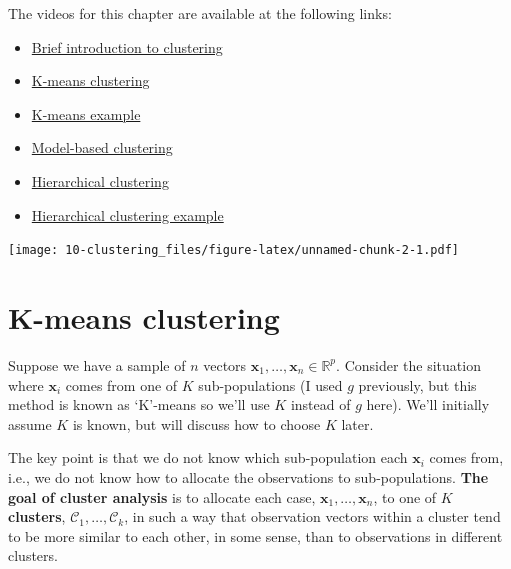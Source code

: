 \documentclass[
]{book}
\providecommand{\tightlist}{%
  \setlength{\itemsep}{0pt}\setlength{\parskip}{0pt}}
\theoremstyle{definition}
\theoremstyle{definition}
\theoremstyle{definition}
\theoremstyle{definition}
\theoremstyle{remark}
\begin{document}
The videos for this chapter are available at the following links:

\begin{itemize}
\tightlist
\item
  \href{https://mediaspace.nottingham.ac.uk/media/ClusteringA+Introduction/1_771r59k0}{Brief introduction to clustering}
\item
  \href{https://mediaspace.nottingham.ac.uk/media/ClusteringA+K-means+clustering/1_vqjrjyey}{K-means clustering}
\item
  \href{https://mediaspace.nottingham.ac.uk/media/ClusteringA+K-means+example/1_6fhpxnii}{K-means example}
\item
  \href{https://mediaspace.nottingham.ac.uk/media/ClusteringA+Model-based+clustering/1_89rjovbp}{Model-based clustering}
\item
  \href{https://mediaspace.nottingham.ac.uk/media/ClusteringA+Hierarchical+methods/1_ngog5anc}{Hierarchical clustering}
\item
  \href{https://mediaspace.nottingham.ac.uk/media/ClusteringA+Hierarchical+example/1_kuzx1iy6}{Hierarchical clustering example}
\end{itemize}

\texttt{[image: 10-clustering\_files/figure-latex/unnamed-chunk-2-1.pdf]}

\hypertarget{k-means-clustering}{%
\section{K-means clustering}\label{k-means-clustering}}

Suppose we have a sample of \(n\) vectors \(\mathbf x_1, \ldots , \mathbf x_n \in \mathbb{R}^p\). Consider the situation where \(\mathbf x_i\) comes from one of \(K\) sub-populations (I used \(g\) previously, but this method is known as `K'-means so we'll use \(K\) instead of \(g\) here). We'll initially assume \(K\) is known, but will discuss how to choose \(K\) later.

The key point is that we do not know which sub-population each \(\mathbf x_i\) comes from, i.e., we do not know how to allocate the observations to sub-populations. \textbf{The goal of cluster analysis} is to allocate each case, \(\mathbf x_1, \ldots, \mathbf x_n\), to one of \(K\) \textbf{clusters}, \(\mathcal{C}_1, \ldots , \mathcal{C}_k\), in such a way that observation vectors within a cluster tend to be more similar to each other, in some sense, than to observations in different clusters.
\end{document}
